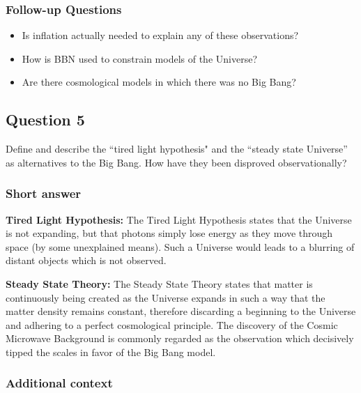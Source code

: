 \documentclass[a4paper,11pt]{article}
\begin{document}
\subsubsection{Follow-up Questions}

\begin{itemize}
    \item Is inflation actually needed to explain any of these observations?
    \item How is BBN used to constrain models of the Universe?
    \item Are there cosmological models in which there was no Big Bang?
\end{itemize}

%
%

\newpage
\subsection{Question 5}

Define and describe the ``tired light hypothesis" and the ``steady state Universe'' as alternatives to the Big Bang. How have they been disproved observationally?

\subsubsection{Short answer}

{\noindent}\textbf{Tired Light Hypothesis:} The Tired Light Hypothesis states that the Universe is not expanding, but that photons simply lose energy as they move through space (by some unexplained means). Such a Universe would leads to a blurring of distant objects which is not observed.

{\noindent}\textbf{Steady State Theory:} The Steady State Theory states that matter is continuously being created as the Universe expands in such a way that the matter density remains constant, therefore discarding a beginning to the Universe and adhering to a perfect cosmological principle. The discovery of the Cosmic Microwave Background is commonly regarded as the observation which decisively tipped the scales in favor of the Big Bang model.

\subsubsection{Additional context}
\end{document}
